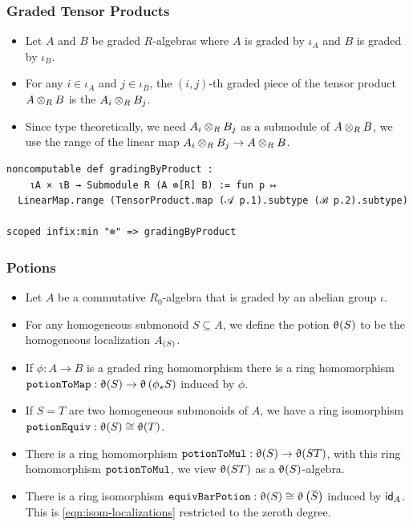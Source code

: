 \documentclass[9pt]{beamer}
\begin{document}
\begin{frame}[fragile]
  \frametitle{Graded Tensor Products}
\begin{itemize}
  \item 
  Let $A$ and $B$ be graded $R$-algebras where $A$ is graded by $\iota_{A}$ and $B$ is graded by $\iota_B$.
  \item 
  For any $i \in \iota_A$ and $j \in \iota_B$, the $(i,j)$-th graded piece of the tensor product $A \otimes_R B$ is the 
  $A_i \otimes_R B_j$. 
  \item 
  Since type theoretically, we need $A_i \otimes_R B_j$ as a submodule of $A \otimes_R B$, we use the range 
  of the linear map $A_i \otimes_R B_j \to A \otimes_R B$.
\end{itemize}
  \begin{lstlisting}[caption={Graded Tensor Product}]
noncomputable def gradingByProduct : 
    ιA × ιB → Submodule R (A ⊗[R] B) := fun p ↦ 
  LinearMap.range (TensorProduct.map (𝒜 p.1).subtype (ℬ p.2).subtype)

scoped infix:min "⊗" => gradingByProduct
  \end{lstlisting}
\end{frame}


\begin{frame}[fragile]
  \frametitle{Potions}
\begin{itemize}
  \item<1-> 
  Let $A$ be a commutative $R_0$-algebra that is graded by an abelian group $\iota$. 
  \item For any homogeneous submonoid $S \subseteq A$, we define the potion $\operatorname{\upvartheta}(S)$ to be the 
  homogeneous localization ${A}_{\left(S\right)}$.
  \item<2-> If $\phi : A \to B$ is a graded ring homomorphism there is a ring homomorphism
  ${\footnotesize{\mathtt{potionToMap}}}: \operatorname{\upvartheta}(S) \to \operatorname{\upvartheta}\left(\phi_{\star} S\right)$ induced by $\phi$.
  \item<3-> If $S = T$ are two homogeneous submonoids of $A$, we have a ring isomorphism ${\footnotesize{\mathtt{potionEquiv}}}: \operatorname{\upvartheta}(S) \cong \operatorname{\upvartheta}(T)$.
  \item<4-> There is a ring homomorphism ${\footnotesize{\mathtt{potionToMul}}}:\operatorname{\upvartheta}(S) \to \operatorname{\upvartheta}(ST)$,
  with this ring homomorphism ${\footnotesize{\mathtt{potionToMul}}}$, we view $\operatorname{\upvartheta}(ST)$ as a $\operatorname{\upvartheta}(S)$-algebra.
  \item<5-> There is a ring isomorphism $\leanmath{equivBarPotion}: \potion(S) \cong \potion\left( \mybar{S} \right)$ induced by $\mathsf{id}_A$. This is \cref{eqn:isom-localizations} restricted to the zeroth degree.
\end{itemize}

\end{frame}
\end{document}
